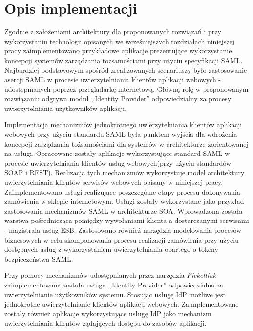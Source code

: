 \chapter{Opis implementacji}
\label{cha:implementacja}

{\it

Zgodnie z założeniami architektury dla proponowanych rozwiązań i przy wykorzystaniu technologii opisanych we wcześniejszych rozdziałach niniejszej pracy zaimplementowano przykładowe aplikacje prezentujące wykorzystanie koncepcji systemów zarządzania tożsamościami przy użyciu specyfikacji SAML. Najbardziej podstawowym spośród zrealizowanych scenariuszy było zastosowanie asercji SAML w procesie uwierzytelniania klientów aplikacji webowych - udostępnianych poprzez przeglądarkę internetową. Główną rolę w proponowanym rozwiązaniu odgrywa moduł ,,Identity Provider'' odpowiedzialny za procesy uwierzytelniania użytkowników aplikacji.

Implementacja mechanizmów jednokrotnego uwierzytelniania klientów aplikacji webowych przy użyciu standardu SAML była punktem wyjścia dla wdrożenia koncepcji zarządzania tożsamościami dla systemów w architekturze zorientowanej na usługi. Opracowane zostały aplikacje wykorzystujące standard SAML w procesie uwierzytelniania klientów usług webowych(przy użyciu standardów SOAP i REST). Realizacja tych mechanizmów wykorzystuje model architektury uwierzytelniania klientów serwisów webowych opisany w niniejszej  pracy. Zaimplementowano usługi realizujące poszczególne etapy procesu dokonywania zamówienia w sklepie internetowym. Usługi zostały wykorzystane jako przykład zastosowania mechanizmów SAML w architekturze SOA. Wprowadzona została warstwa pośrednicząca pomiędzy wywołaniami klienta a dostarczanymi serwisami - magistrala usług ESB. Zastosowano również narzędzia modelowania procesów biznesowych w celu skomponowania procesu realizacji zamówienia przy użyciu dostępnych usług z wykorzystaniem uwierzytelniania opartego o tokeny bezpieczeństwa SAML. 

}



	Przy pomocy mechanizmów udostępnianych przez narzędzia \textit{Picketlink} zaimplementowana została usługa ,,Identity Provider'' odpowiedzialna za uwierzytelnianie użytkowników systemu. Stosując usługę IdP możliwe jest jednokrotne uwierzytelnianie klientów aplikacji webowych. Zaimplementowane zostały również aplikacje wykorzystujące usługę IdP jako mechanizm uwierzytelniania klientów żądających dostępu do zasobów aplikacji.

